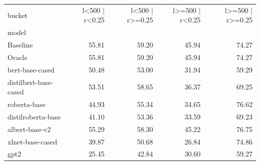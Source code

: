 \begin{tabular}{lrrrr}
\toprule
bucket & l<500 | r<0.25 & l<500 | r>=0.25 & l>=500 | r<0.25 & l>=500 | r>=0.25 \\
model &  &  &  &  \\
\midrule
Baseline & 55.81 & 59.20 & 45.94 & 74.27 \\
Oracle & 55.81 & 59.20 & 45.94 & 74.27 \\
bert-base-cased & 50.48 & 53.00 & 31.94 & 59.29 \\
distilbert-base-cased & 53.51 & 58.65 & 36.37 & 69.25 \\
roberta-base & 44.93 & 55.34 & 34.65 & 76.62 \\
distilroberta-base & 41.10 & 53.36 & 33.59 & 69.23 \\
albert-base-v2 & 55.29 & 58.30 & 45.22 & 76.75 \\
xlnet-base-cased & 39.87 & 50.68 & 26.84 & 74.86 \\
gpt2 & 25.45 & 42.84 & 30.60 & 59.27 \\
\bottomrule
\end{tabular}
